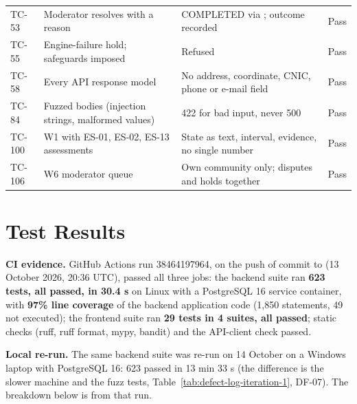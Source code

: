 \begin{longtable}{@{}L{26pt}L{111pt}L{158pt}L{64pt}@{}}
TC-53 & Moderator resolves with a reason & COMPLETED via ; outcome recorded & Pass \\
TC-55 & Engine-failure hold; safeguards imposed & Refused & Pass \\
TC-58 & Every API response model & No address, coordinate, CNIC, phone or e-mail field & Pass \\
TC-84 & Fuzzed bodies (injection strings, malformed values) & 422 for bad input, never 500 & Pass \\
TC-100 & W1 with ES-01, ES-02, ES-13 assessments & State as text, interval, evidence, no single number & Pass \\
TC-106 & W6 moderator queue & Own community only; disputes and holds together & Pass \\
\end{longtable}
\endgroup
\section{Test Results}\label{sec:test-results}
\textbf{CI evidence.} GitHub Actions run 38464197964, on the push of commit  to  (13 October 2026, 20:36 UTC), passed all three jobs: the backend suite ran \textbf{623 tests, all passed, in 30.4 s} on Linux with a PostgreSQL 16 service container, with \textbf{97\% line coverage} of the backend application code (1,850 statements, 49 not executed); the frontend suite ran \textbf{29 tests in 4 suites, all passed}; static checks (ruff, ruff format, mypy, bandit) and the API-client check passed.

\textbf{Local re-run.} The same backend suite was re-run on 14 October on a Windows laptop with PostgreSQL 16: 623 passed in 13 min 33 s (the difference is the slower machine and the fuzz tests, Table~\ref{tab:defect-log-iteration-1}, DF-07). The breakdown below is from that run.


